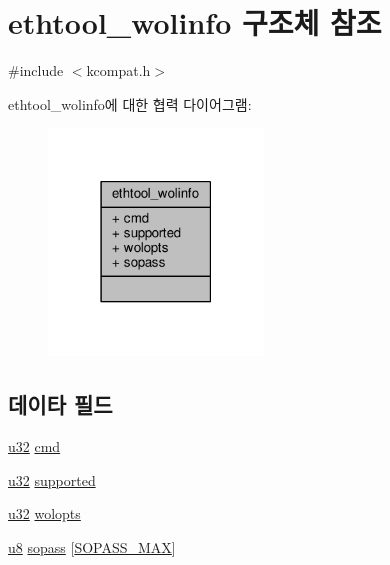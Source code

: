 \hypertarget{structethtool__wolinfo}{}\section{ethtool\+\_\+wolinfo 구조체 참조}
\label{structethtool__wolinfo}


{\ttfamily \#include $<$kcompat.\+h$>$}



ethtool\+\_\+wolinfo에 대한 협력 다이어그램\+:
\nopagebreak
\begin{figure}[H]
\begin{center}
\leavevmode
\includegraphics[width=162pt]{structethtool__wolinfo__coll__graph}
\end{center}
\end{figure}
\subsection*{데이타 필드}
\begin{DoxyCompactItemize}
\item 
\hyperlink{lib_2igb_2e1000__osdep_8h_a64e91c10a0d8fb627e92932050284264}{u32} \hyperlink{structethtool__wolinfo_a62fe2a1dbf17d5a8561a5a7f5a97a9ba}{cmd}
\item 
\hyperlink{lib_2igb_2e1000__osdep_8h_a64e91c10a0d8fb627e92932050284264}{u32} \hyperlink{structethtool__wolinfo_ab9b31497a07d4762168b1880b3b6b343}{supported}
\item 
\hyperlink{lib_2igb_2e1000__osdep_8h_a64e91c10a0d8fb627e92932050284264}{u32} \hyperlink{structethtool__wolinfo_abaf252440354967181960eedd49a4580}{wolopts}
\item 
\hyperlink{lib_2igb_2e1000__osdep_8h_a8baca7e76da9e0e11ce3a275dd19130c}{u8} \hyperlink{structethtool__wolinfo_a19b9efa40f1adfcdbc5003b28a3823f1}{sopass} \mbox{[}\hyperlink{kcompat_8h_ab9285d527fa563fa11c3fcf35594c34e}{S\+O\+P\+A\+S\+S\+\_\+\+M\+AX}\mbox{]}
\end{DoxyCompactItemize}


